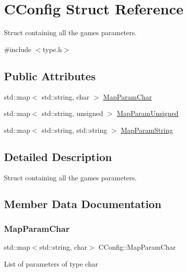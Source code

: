 \hypertarget{struct_c_config}{}\section{C\+Config Struct Reference}
\label{struct_c_config}


Struct containing all the game\textquotesingle{}s parameters.  




{\ttfamily \#include $<$type.\+h$>$}

\subsection*{Public Attributes}
\begin{DoxyCompactItemize}
\item 
std\+::map$<$ std\+::string, char $>$ \hyperlink{struct_c_config_a31779d295dbce92ea2d8584a59ce8c86}{Map\+Param\+Char}
\item 
std\+::map$<$ std\+::string, unsigned $>$ \hyperlink{struct_c_config_a7ea31231c0cd120f6ac5b7390bfded2d}{Map\+Param\+Unsigned}
\item 
std\+::map$<$ std\+::string, std\+::string $>$ \hyperlink{struct_c_config_a5b860baf935afb7f1fb151d3a3d5de00}{Map\+Param\+String}
\end{DoxyCompactItemize}


\subsection{Detailed Description}
Struct containing all the game\textquotesingle{}s parameters. 

\subsection{Member Data Documentation}
\mbox{\label{struct_c_config_a31779d295dbce92ea2d8584a59ce8c86}} 
\subsubsection{\texorpdfstring{Map\+Param\+Char}{MapParamChar}}
{\footnotesize\ttfamily std\+::map$<$std\+::string, char$>$ C\+Config\+::\+Map\+Param\+Char}

List of parameters of type char \mbox{\label{struct_c_config_a5b860baf935afb7f1fb151d3a3d5de00}} 
